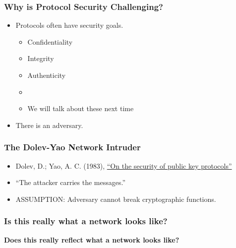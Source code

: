 \documentclass[red]{beamer}
\begin{document}
\begin{frame}\frametitle{Why is Protocol Security Challenging?}
\begin{itemize}
\pause
\item Protocols often have security goals.
\begin{itemize}
\item Confidentiality
\item Integrity
\item Authenticity
\item[]
\item We will talk about these next time
\end{itemize}
\pause
\item There is an adversary.
\end{itemize}

\end{frame}

\begin{frame}\frametitle{The Dolev-Yao Network Intruder}
\begin{itemize}
\item Dolev, D.; Yao, A. C. (1983), \href{http://www.cs.huji.ac.il/~dolev/pubs/dolev-yao-ieee-01056650.pdf}{``On the security of public key protocols''}
\item “The attacker carries the messages.”
\item ASSUMPTION: Adversary cannot break cryptographic functions.
\end{itemize}
\end{frame}

\begin{frame}\frametitle{Is this really what a network looks like?}
\pause
{}
\bigskip

\centering
\textbf{Does this really reflect what a network looks like?}
\end{frame}
\end{document}
